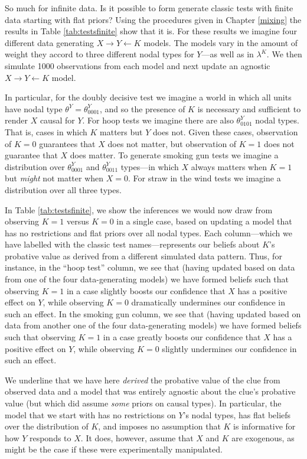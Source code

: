 \documentclass[
  12pt,
]{book}
\begin{document}
So much for infinite data. Is it possible to form generate classic tests with finite data starting with flat priors? Using the procedures given in Chapter \ref{mixing} the results in Table \ref{tab:testsfinite} show that it is. For these results we imagine four different data generating \(X \rightarrow Y \leftarrow K\) models. The models vary in the amount of weight they accord to three different nodal types for \(Y\)---as well as in \(\lambda^K\). We then simulate 1000 observations from each model and next update an agnostic \(X \rightarrow Y \leftarrow K\) model.

In particular, for the doubly decisive test we imagine a world in which all units have nodal type \(\theta^Y = \theta^Y_{0001}\), and so the presence of \(K\) is necessary and sufficient to render \(X\) causal for \(Y\). For hoop tests we imagine there are also \(\theta^Y_{0101}\) nodal types. That is, cases in which \(K\) matters but \(Y\) does not. Given these cases, observation of \(K=0\) guarantees that \(X\) does not matter, but observation of \(K=1\) does not guarantee that \(X\) does matter. To generate smoking gun tests we imagine a distribution over \(\theta^Y_{0001}\) and \(\theta^Y_{0011}\) types---in which \(X\) always matters when \(K=1\) but \emph{might} not matter when \(X=0\). For straw in the wind tests we imagine a distribution over all three types.

In Table \ref{tab:testsfinite}, we show the inferences we would now draw from observing \(K=1\) versus \(K=0\) in a single case, based on updating a model that has no restrictions and flat priors over all nodal types. Each column---which we have labelled with the classic test names---represents our beliefs about \(K\)'s probative value as derived from a different simulated data pattern. Thus, for instance, in the ``hoop test'' column, we see that (having updated based on data from one of the four data-generating models) we have formed beliefs such that observing \(K=1\) in a case slightly boosts our confidence that \(X\) has a positive effect on \(Y\), while observing \(K=0\) dramatically undermines our confidence in such an effect. In the smoking gun column, we see that (having updated based on data from another one of the four data-generating models) we have formed beliefs such that observing \(K=1\) in a case greatly boosts our confidence that \(X\) has a positive effect on \(Y\), while observing \(K=0\) slightly undermines our confidence in such an effect.

We underline that we have here \emph{derived} the probative value of the clue from observed data and a model that was entirely agnostic about the clue's probative value (but which did assume \emph{some} priors on causal types). In particular, the model that we start with has no restrictions on \(Y\)'s nodal types, has flat beliefs over the distribution of \(K\), and imposes no assumption that \(K\) is informative for how \(Y\) responds to \(X\). It does, however, assume that \(X\) and \(K\) are exogenous, as might be the case if these were experimentally manipulated.
\end{document}

